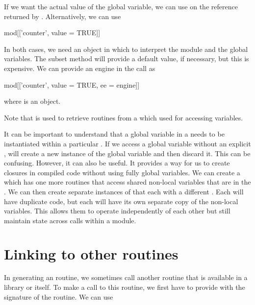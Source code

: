 If we want the actual value of the global variable, 
we can use  on the reference
returned by .
Alternatively, we can use
\begin{RCode}
mod[['counter', value = TRUE]]
\end{RCode}
In both cases, we need an  object 
in which to interpret the module and the global variables.
The subset method will provide a default value, if necessary,
but this is expensive.
We can provide an engine in the call as
\begin{RCode}
mod[['counter', value = TRUE, ee = engine]]
\end{RCode}
where  is an  object.

Note that \Rop{\$} is used to retrieve routines from a 
which \Rop{[[} used for accessing variables.

It can be important to understand that a global variable in a
 needs to be instantiated within a particular
.  If we access a global variable without an
explicit ,  will create a new
instance of the global variable and then discard it.  This can be
confusing. However, it can also be useful.  It provides a way for us
to create closures in compiled code without using fully global
variables.  We can create a  which has one more
routines that access shared non-local variables that are in the
.  We can then create separate instances of that
 each with a different .  Each
 will have duplicate code, but each will have
its own separate copy of the non-local variables.  This allows them to
operate independently of each other but still maintain state across
calls within a module.





\section{Linking to other routines}
In generating an \llvm{} routine, we sometimes call another routine
that is available in a library or \R{} itself. 
To make a call to this routine, we first have to provide \llvm{}
with the signature of the routine.
We can use 


